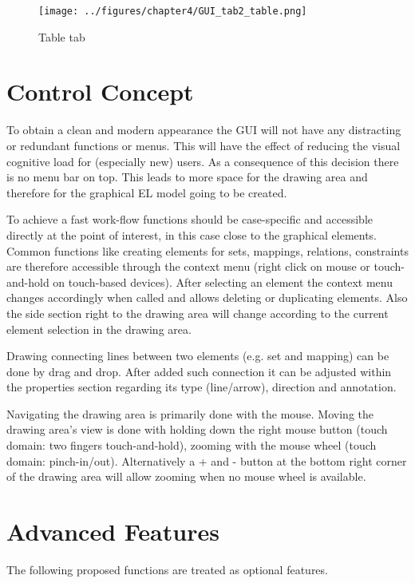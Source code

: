 \documentclass[twoside, openright, 12pt]{book}
\begin{document}
\begin{figure}[htb]
	\centering
	\texttt{[image: ../figures/chapter4/GUI\_tab2\_table.png]}
	\caption{Table tab}
	\label{fig:GUI_tab2_table}
\end{figure}



\section{Control Concept}
\label{GUI_concept}
To obtain a clean and modern appearance the GUI will not have any distracting or redundant functions or menus.
This will have the effect of reducing the visual cognitive load for (especially new) users.
As a consequence of this decision there is no menu bar on top.
This leads to more space for the drawing area and therefore for the graphical EL model going to be created.

To achieve a fast work-flow functions should be case-specific and accessible directly at the point of interest, in this case close to the graphical elements.
Common functions like creating elements for sets, mappings, relations, constraints are therefore accessible through the context menu (right click on mouse or touch-and-hold on touch-based devices).
After selecting an element the context menu changes accordingly when called and allows deleting or duplicating elements.
Also the side section right to the drawing area will change according to the current element selection in the drawing area.

Drawing connecting lines between two elements (e.g. set and mapping) can be done by drag and drop.
After added such connection it can be adjusted within the properties section regarding its type (line/arrow), direction and annotation.

Navigating the drawing area is primarily done with the mouse.
Moving the drawing area's view is done with holding down the right mouse button (touch domain: two fingers touch-and-hold), zooming with the mouse wheel (touch domain: pinch-in/out).
Alternatively a + and - button at the bottom right corner of the drawing area will allow zooming when no mouse wheel is available.




\section{Advanced Features}
\label{editor_extensions}
The following proposed functions are treated as optional features.
\end{document}
